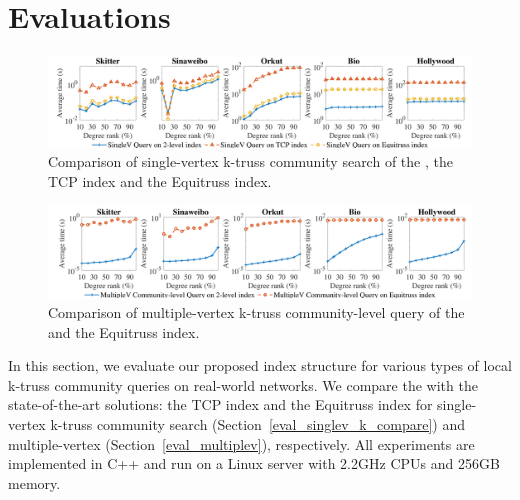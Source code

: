 \section{Evaluations}
\label{evaluation}

\begin{figure}[h]
    \centering
    \includegraphics[width=0.9\linewidth, trim={0cm 0cm, 0cm, 0.3cm}, clip]{./figures/singlev_k_compare_small.pdf}
    \caption{Comparison of single-vertex k-truss community search of the \twolevelindex{}, the TCP index and the Equitruss index.}
    \label{fig:singlev_k_compare}
		\vspace{-0.3cm}
\end{figure}

\begin{figure}[h]
    \centering
    \includegraphics[width=0.9\linewidth, trim={0cm 0cm, 0cm, 0.3cm}, clip]{./figures/multiplev_k_compare_small.pdf}
    \caption{Comparison of multiple-vertex k-truss community-level query of the \twolevelindex{} and the Equitruss index.}
    \label{fig:multiplev_k_compare}
		\vspace{-0.3cm}
\end{figure}

In this section, we evaluate our proposed index structure for various types of local k-truss community queries on real-world networks. We compare the \twolevelindex{} with the state-of-the-art solutions: the TCP index \cite{huang2014querying} and the Equitruss index \cite{akbas2017truss} for single-vertex k-truss community search (Section~\ref{eval_singlev_k_compare}) and multiple-vertex \probdef{} (Section~\ref{eval_multiplev}), respectively. All experiments are implemented in C++ and run on a Linux server with 2.2GHz CPUs and 256GB memory. 

